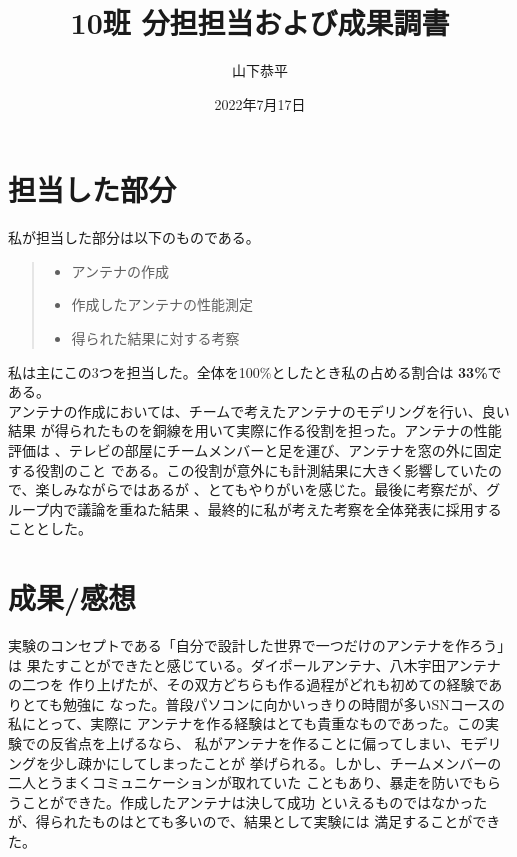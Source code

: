 \documentclass[dvipdfmx,autodetect-engine]{jsarticle}
\title{10班 分担担当および成果調書}
\author{山下恭平}
\date{2022年7月17日}
\begin{document}
 
 \maketitle

\section{担当した部分}
私が担当した部分は以下のものである。

\begin{quote}
  \begin{itemize}
   \item アンテナの作成
   \item 作成したアンテナの性能測定
   \item 得られた結果に対する考察
  \end{itemize}
 \end{quote}

 私は主にこの3つを担当した。全体を100\%としたとき私の占める割合は
 \textbf{33\%}である。\\

 アンテナの作成においては、チームで考えたアンテナのモデリングを行い、良い結果
 が得られたものを銅線を用いて実際に作る役割を担った。アンテナの性能評価は
 、テレビの部屋にチームメンバーと足を運び、アンテナを窓の外に固定する役割のこと
 である。この役割が意外にも計測結果に大きく影響していたので、楽しみながらではあるが
 、とてもやりがいを感じた。最後に考察だが、グループ内で議論を重ねた結果
 、最終的に私が考えた考察を全体発表に採用することとした。

 \section*{成果/感想}
 実験のコンセプトである「自分で設計した世界で一つだけのアンテナを作ろう」は
 果たすことができたと感じている。ダイポールアンテナ、八木宇田アンテナの二つを
 作り上げたが、その双方どちらも作る過程がどれも初めての経験でありとても勉強に
 なった。普段パソコンに向かいっきりの時間が多いSNコースの私にとって、実際に
 アンテナを作る経験はとても貴重なものであった。この実験での反省点を上げるなら、
 私がアンテナを作ることに偏ってしまい、モデリングを少し疎かにしてしまったことが
 挙げられる。しかし、チームメンバーの二人とうまくコミュニケーションが取れていた
 こともあり、暴走を防いでもらうことができた。作成したアンテナは決して成功
 といえるものではなかったが、得られたものはとても多いので、結果として実験には
 満足することができた。
\end{document}
